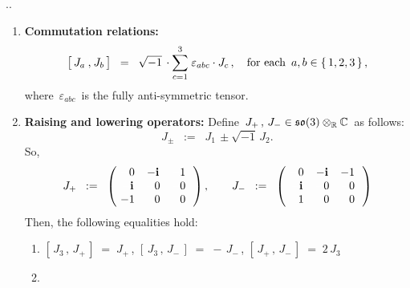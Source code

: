 \begin{proposition}
{\color{white}.}\vskip -0.5cm{\color{white}.}
\begin{enumerate}
\item
	\textbf{Commutation relations:}\;\;
	\begin{equation*}
	\left[\,J_{a}\,\overset{{\color{white}1}}{,}\,J_{b}\,\right]
	\;\; = \;\;
		\sqrt{-1}\,\cdot\overset{3}{\underset{c=1}{\sum}}\;\varepsilon_{abc}\cdot J_{c}\,,
	\quad
	\textnormal{for each \,$a, b \in \{\,1,2,3\,\}$}\,,
	\end{equation*}
	where \,$\varepsilon_{abc}$\, is the fully anti-symmetric tensor.
\item
	\textbf{Raising and lowering operators:}\;\;
	Define \,$J_{+}\,,\, J_{-} \in \mathfrak{so}(3) \otimes_{\mathbb{R}} \mathbb{C}$\, as follows:
	\begin{equation*}
	J_{\pm} \;\; := \;\; J_{1} \, \pm \sqrt{-1}\,J_{2}.
	\end{equation*}
	So,
	\begin{equation*}
	J_{+}
	\;\; := \;\;
	\left(\!
		\begin{array}{ccc}
			{\color{white}-}0 & {\color{black}-}\i & {\color{white}-}1 \\
			{\color{white}-}\i & {\color{white}-}0 & {\color{white}-}0 \\
			{\color{black}-}1 & {\color{white}-}0 & {\color{white}-}0 \\
			\end{array}
		\,\right),
	\quad\quad
	J_{-}
	\;\; := \;\;
	\left(\!
		\begin{array}{ccc}
			{\color{white}-}0 & {\color{black}-}\i & {\color{black}-}1 \\
			{\color{white}-}\i & {\color{white}-}0 & {\color{white}-}0 \\
			{\color{white}-}1 & {\color{white}-}0 & {\color{white}-}0 \\
			\end{array}
		\,\right)
	\end{equation*}
	Then, the following equalities hold:
	\begin{enumerate}
	\item
		$\left[\,J_{3}\,,\,J_{+}\,\right] \;=\; J_{+}$\,,
		\quad
		$\left[\,J_{3}\,,\,J_{-}\,\right] \;=\; -\,J_{-}$\,,
		\quad
		$\left[\,J_{+}\,,\,J_{-}\,\right] \;=\; 2\,J_{3}$
	\item

\end{enumerate}
\end{enumerate}
\end{proposition}
